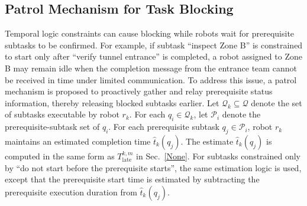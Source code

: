 \documentclass[lettersize,journal]{IEEEtran}
\begin{document}


\subsection{Patrol Mechanism for Task Blocking}

Temporal logic constraints can cause blocking while robots wait for prerequisite subtasks to be confirmed. For example, if subtask ``inspect Zone B'' is constrained to start only after ``verify tunnel entrance'' is completed, a robot assigned to Zone B may remain idle when the completion message from the entrance team cannot be received in time under limited communication. To address this issue, a patrol mechanism is proposed to proactively gather and relay prerequisite status information, thereby releasing blocked subtasks earlier.
Let \(\mathcal{Q}_k \subseteq \mathcal{Q}\) denote the set of subtasks executable by robot \(r_k\). For each \(q_i \in \mathcal{Q}_k\), let \(\mathcal{P}_i\) denote the prerequisite-subtask set of \(q_i\). For each prerequisite subtask \(q_j \in \mathcal{P}_i\), robot \(r_k\) maintains an estimated completion time \(\hat{t}_k(q_j)\). The estimate \(\hat{t}_k(q_j)\) is computed in the same form as \(T_{\mathrm{late}}^{k,m}\) in Sec.~\ref{None}. For subtasks constrained only by ``do not start before the prerequisite starts'', the same estimation logic is used, except that the prerequisite start time is estimated by subtracting the prerequisite execution duration from \(\hat{t}_k(q_j)\).

\end{document}
